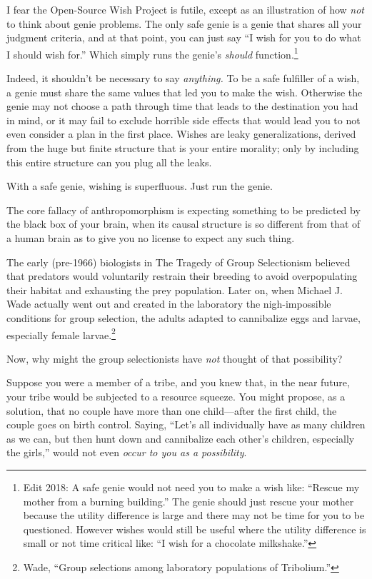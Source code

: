 {
 I fear the Open-Source Wish Project is futile, except as an
illustration of how \textit{not} to think about genie problems. The
only safe genie is a genie that shares all your judgment criteria, and
at that point, you can just say ``I wish for you to do
what I should wish for.'' Which simply runs the
genie's \textit{should} function.\footnote{Edit 2018: A safe genie would not need you to make a wish like: ``Rescue my mother from a burning building.'' The genie should just rescue your mother because the utility difference is large and there may not be time for you to be questioned. However wishes would still be useful where the utility difference is small or not time critical like: ``I wish for a chocolate milkshake.''}


 Indeed, it shouldn't be necessary to say
\textit{anything.} To be a safe fulfiller of a wish, a genie must share
the same values that led you to make the wish. Otherwise the genie may
not choose a path through time that leads to the destination you had in
mind, or it may fail to exclude horrible side effects that would lead
you to not even consider a plan in the first place. Wishes are leaky
generalizations, derived from the huge but finite structure that is
your entire morality; only by including this entire structure can you
plug all the leaks.


 With a safe genie, wishing is superfluous. Just run the genie.

\myendsectiontext



 The core fallacy of anthropomorphism is expecting something to be
predicted by the black box of your brain, when its causal structure is
so different from that of a human brain as to give you no license to
expect any such thing. 

{
 The early (pre-1966) biologists in The Tragedy of Group
Selectionism believed that predators would voluntarily restrain their
breeding to avoid overpopulating their habitat and exhausting the prey
population. Later on, when Michael J. Wade actually went out and
created in the laboratory the nigh-impossible conditions for group
selection, the adults adapted to cannibalize eggs and larvae,
especially female larvae.\footnote{Wade, ``Group selections among laboratory
populations of Tribolium.''}}


 Now, why might the group selectionists have \textit{not} thought
of that possibility?

{
 Suppose you were a member of a tribe, and you knew that, in the
near future, your tribe would be subjected to a resource squeeze. You
might propose, as a solution, that no couple have more than one
child---after the first child, the couple goes on birth control.
Saying, ``Let's all individually have
as many children as we can, but then hunt down and cannibalize each
other's children, especially the
girls,'' would not even \textit{occur to you as a
possibility}.}


}
